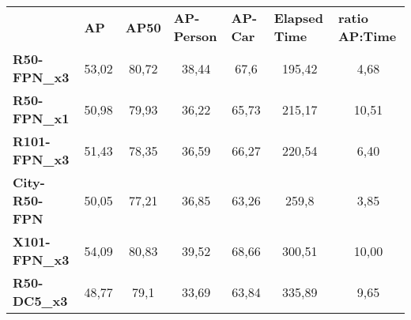 \documentclass[12pt,a4paper,twocolumn,twoside]{article}
\begin{document}
\begin{table*}[ht]
\centering
\begin{tabularx}{\textwidth}{lcccccc}
\hline
                                            & \multicolumn{1}{l}{\textbf{AP}} & \multicolumn{1}{l}{\textbf{AP50}} & \multicolumn{1}{l}{\textbf{AP-Person}} & \multicolumn{1}{l}{\textbf{AP-Car}} & \multicolumn{1}{l}{\textbf{Elapsed Time}} & \multicolumn{1}{l}{\textbf{ratio AP:Time}} \\ \cline{1-7}
\multicolumn{1}{|l|}{\textbf{R50-FPN\_x3}}  & \multicolumn{1}{c|}{53,02}      & \multicolumn{1}{c|}{80,72}        & \multicolumn{1}{c|}{38,44}             & 67,6                                & 195,42                                    & 4,68                                       \\ \cline{1-7}
\multicolumn{1}{|l|}{\textbf{R50-FPN\_x1}}  & \multicolumn{1}{c|}{50,98}      & \multicolumn{1}{c|}{79,93}        & \multicolumn{1}{c|}{36,22}             & 65,73                               & 215,17                                    & 10,51                                      \\ \cline{1-7}
\multicolumn{1}{|l|}{\textbf{R101-FPN\_x3}} & \multicolumn{1}{c|}{51,43}      & \multicolumn{1}{c|}{78,35}        & \multicolumn{1}{c|}{36,59}             & 66,27                               & 220,54                                    & 6,40                                       \\ \cline{1-7}
\multicolumn{1}{|l|}{\textbf{City-R50-FPN}} & \multicolumn{1}{c|}{50,05}      & \multicolumn{1}{c|}{77,21}        & \multicolumn{1}{c|}{36,85}             & 63,26                               & 259,8                                     & 3,85                                       \\ \cline{1-7}
\multicolumn{1}{|l|}{\textbf{X101-FPN\_x3}} & \multicolumn{1}{c|}{54,09}      & \multicolumn{1}{c|}{80,83}        & \multicolumn{1}{c|}{39,52}             & 68,66                               & 300,51                                    & 10,00                                      \\ \cline{1-7}
\multicolumn{1}{|l|}{\textbf{R50-DC5\_x3}}  & \multicolumn{1}{c|}{48,77}      & \multicolumn{1}{c|}{79,1}         & \multicolumn{1}{c|}{33,69}             & 63,84                               & 335,89                                    & 9,65                                       \\ \cline{1-7}

\end{tabularx}
\end{table*}
\end{document}
